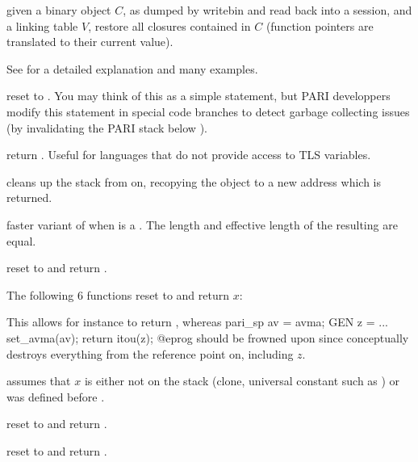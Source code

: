  given a binary object $C$, as dumped
by writebin and read back into a session, and a linking table $V$, restore all
closures contained in $C$ (function pointers are translated to their current
value).

See  for a detailed explanation and many examples.

 reset  to . You may think
of this as a simple  statement, but PARI developpers modify
this statement in special code branches to detect garbage collecting
issues (by invalidating the PARI stack below ).

 return . Useful for languages that
do not provide access to TLS variables.

 cleans up the stack from
 on, recopying the object  to a new address which is
returned.

 faster variant of  when
 is a . The length and effective length of the resulting
 are equal.

 reset  to  and return
.

The following 6 functions reset  to  and return $x$:





 This allows for instance
to return , whereas
\bprog
  pari_sp av = avma;
  GEN z = ...
  set_avma(av);
  return itou(z);
@eprog should be frowned upon since  conceptually
destroys everything from the reference point on, including $z$.

 assumes that $x$ is either not on the
stack (clone, universal constant such as ) or was defined
before .

 reset  to  and return
.

 reset  to  and return
.

